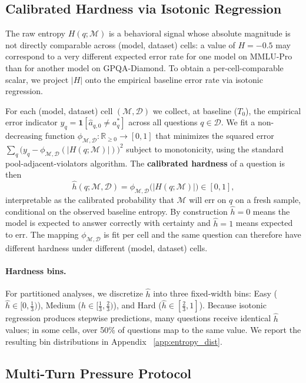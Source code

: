 \subsection{Calibrated Hardness via Isotonic Regression}
\label{sec:methods:hardness}

The raw entropy $H(q;\mathcal{M})$ is a behavioral signal whose
absolute magnitude is not directly comparable across (model, dataset)
cells: a value of $H = -0.5$ may correspond to a very different
expected error rate for one model on MMLU-Pro than for another model
on GPQA-Diamond. To obtain a per-cell-comparable scalar, we project
$|H|$ onto the empirical baseline error rate via isotonic regression.

For each (model, dataset) cell $(\mathcal{M}, \mathcal{D})$ we
collect, at baseline ($T_0$), the empirical error indicator
$y_q = \mathbf{1}[\hat{a}_{q,0} \neq a^*_q]$ across all questions
$q \in \mathcal{D}$. We fit a non-decreasing function
$\phi_{\mathcal{M},\mathcal{D}}: \mathbb{R}_{\geq 0} \to [0, 1]$ that
minimizes the squared error
$\sum_q \big(y_q - \phi_{\mathcal{M},\mathcal{D}}(|H(q;\mathcal{M})|)\big)^2$
subject to monotonicity, using the standard pool-adjacent-violators
algorithm. The \textbf{calibrated hardness} of a question is then
\[
\hat{h}(q;\mathcal{M},\mathcal{D}) = \phi_{\mathcal{M},\mathcal{D}}\!\bigl(|H(q;\mathcal{M})|\bigr) \in [0, 1],
\]
interpretable as the calibrated probability that $\mathcal{M}$ will
err on $q$ on a fresh sample, conditional on the observed baseline
entropy. By construction $\hat{h} = 0$ means the model is expected
to answer correctly with certainty and $\hat{h} = 1$ means expected
to err. The mapping $\phi_{\mathcal{M},\mathcal{D}}$ is fit per cell
and the same question can therefore have different hardness under
different (model, dataset) cells.

\paragraph{Hardness bins.} For partitioned analyses, we discretize $\hat{h}$ into three fixed-width bins: Easy ($\hat{h} \in [0, \frac{1}{3})$), Medium ($\hat{h} \in [\frac{1}{3}, \frac{2}{3})$), and Hard ($\hat{h} \in [\frac{2}{3}, 1]$). Because isotonic regression produces stepwise predictions, many questions receive identical $\hat{h}$ values; in some cells, over 50\% of questions map to the same value. We report the resulting bin distributions in Appendix ~\ref{app:entropy_dist}.

\subsection{Multi-Turn Pressure Protocol}
\label{sec:methods:pressure}

